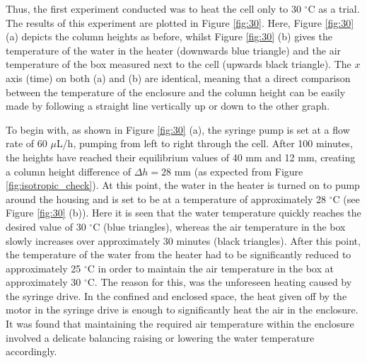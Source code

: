 Thus, the first experiment conducted was to heat the cell only to 30 $^{\circ}\text{C}$ as a trial. The results of this experiment are plotted in Figure \ref{fig:30}. Here, Figure \ref{fig:30} (a) depicts the column heights as before, whilst Figure \ref{fig:30} (b) gives the temperature of the water in the heater (downwards blue triangle) and the air temperature of the box measured next to the cell (upwards black triangle). The $x$ axis (time) on both (a) and (b) are identical, meaning that a direct comparison between the temperature of the enclosure and the column height can be easily made by following a straight line vertically up or down to the other graph.

To begin with, as shown in Figure \ref{fig:30} (a), the syringe pump is set at a flow rate of 60 $\mu$L/h, pumping from left to right through the cell. After 100 minutes, the heights have reached their equilibrium values of 40 mm and 12 mm, creating a column height difference of $\Delta h=28\text{ mm}$ (as expected from Figure \ref{fig:isotropic_check}). At this point, the water in the heater is turned on to pump around the housing and is set to be at a temperature of approximately 28 $^{\circ}$C (see Figure \ref{fig:30} (b)). Here it is seen that the water temperature quickly reaches the desired value of 30 $^{\circ}\text{C}$ (blue triangles), whereas the air temperature in the box slowly increases over approximately 30 minutes (black triangles). After this point, the temperature of the water from the heater had to be significantly reduced to approximately 25 $^{\circ}\text{C}$ in order to maintain the air temperature in the box at approximately 30 $^{\circ}\text{C}$. The reason for this, was the unforeseen heating caused by the syringe drive. In the confined and enclosed space, the heat given off by the motor in the syringe drive is enough to significantly heat the air in the enclosure. It was found that maintaining the required air temperature within the enclosure involved a delicate balancing raising or lowering the water temperature accordingly.

